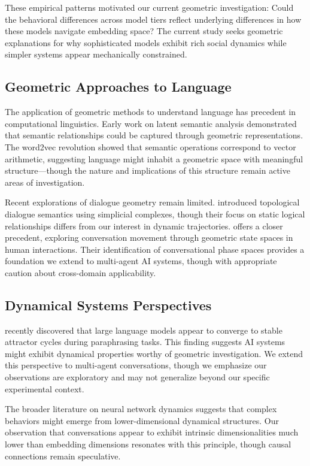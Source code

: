 \documentclass[11pt,letterpaper]{article}
\begin{document}
These empirical patterns motivated our current geometric investigation: Could the behavioral differences across model tiers reflect underlying differences in how these models navigate embedding space? The current study seeks geometric explanations for why sophisticated models exhibit rich social dynamics while simpler systems appear mechanically constrained.

\subsection{Geometric Approaches to Language}

The application of geometric methods to understand language has precedent in computational linguistics. Early work on latent semantic analysis \citep{landauer1997solution} demonstrated that semantic relationships could be captured through geometric representations. The word2vec revolution \citep{mikolov2013distributed} showed that semantic operations correspond to vector arithmetic, suggesting language might inhabit a geometric space with meaningful structure—though the nature and implications of this structure remain active areas of investigation.

Recent explorations of dialogue geometry remain limited. \citet{ballus2024topological} introduced topological dialogue semantics using simplicial complexes, though their focus on static logical relationships differs from our interest in dynamic trajectories. \citet{brinberg2024state} offers a closer precedent, exploring conversation movement through geometric state spaces in human interactions. Their identification of conversational phase spaces provides a foundation we extend to multi-agent AI systems, though with appropriate caution about cross-domain applicability.

\subsection{Dynamical Systems Perspectives}

\citet{wang2025attractor} recently discovered that large language models appear to converge to stable attractor cycles during paraphrasing tasks. This finding suggests AI systems might exhibit dynamical properties worthy of geometric investigation. We extend this perspective to multi-agent conversations, though we emphasize our observations are exploratory and may not generalize beyond our specific experimental context.

The broader literature on neural network dynamics \citep{sussillo2013opening} suggests that complex behaviors might emerge from lower-dimensional dynamical structures. Our observation that conversations appear to exhibit intrinsic dimensionalities much lower than embedding dimensions resonates with this principle, though causal connections remain speculative.
\end{document}
